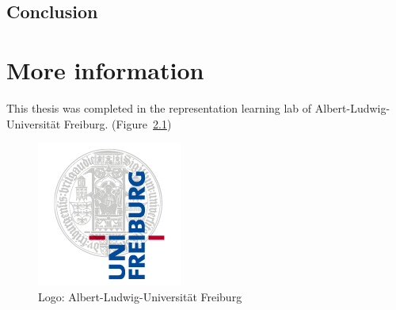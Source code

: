 \documentclass[11pt]{report}
\begin{document}
\section{Conclusion}




\appendix
\chapter{More information}
This thesis was completed in the representation learning lab of Albert-Ludwig-Universität Freiburg.  (Figure~\ref{fig:UniLogo})

\begin{figure}[htb]
  \centering
    \includegraphics[scale=0.35]{images/logo}
    \caption{Logo: Albert-Ludwig-Universität Freiburg}
    \label{fig:UniLogo}
\end{figure}
\end{document}
